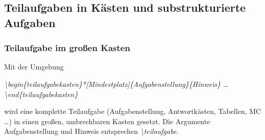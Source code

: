 \documentclass[../main.tex]{subfiles}
\begin{document}
\subsection{Teilaufgaben in Kästen und substrukturierte Aufgaben}\label{sec:teilkasten}
\subsubsection{Teilaufgabe im großen Kasten}
Mit der Umgebung
\begin{center}
\textit{\hypertarget{teilaufgabekasten}{\textbackslash begin\{teilaufgabekasten\}*[Mindestplatz]\{Aufgabenstellung\}\{Hinweis\}} \dots{} \textbackslash end\{teilaufgabekasten\}}
\end{center}
wird eine komplette Teilaufgabe (Aufgabenstellung, Antwortkästen, Tabellen, MC \dots) in einen großen, umbrechbaren Kasten gesetzt. Die Argumente Aufgabenstellung und Hinweis entsprechen \textit{\textbackslash teilaufgabe}.
\end{document}
